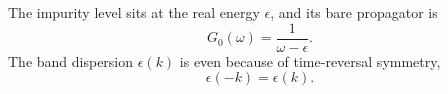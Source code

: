 \documentclass{article}
\begin{document}
The impurity level sits at the real energy $\epsilon$, and its bare propagator is
\begin{equation}
G_0(\omega) = \frac{1}{\omega - \epsilon} .
\label{eq:g0}
\end{equation}
The band dispersion $\epsilon(k)$ is even because of time-reversal symmetry,
\begin{equation}
\epsilon(-k) = \epsilon(k) .
\label{eq:even}
\end{equation}
\end{document}
